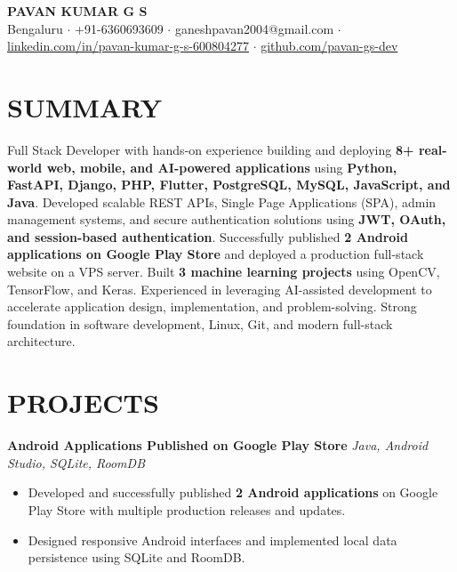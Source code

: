 \documentclass[10pt,a4paper]{article}
\begin{document}

\begin{center}
{\Huge \textbf{PAVAN KUMAR G S}}\\[2pt]

Bengaluru $\cdot$
+91-6360693609 $\cdot$
ganeshpavan2004@gmail.com $\cdot$
\href{https://linkedin.com/in/pavan-kumar-g-s-600804277}{linkedin.com/in/pavan-kumar-g-s-600804277}
$\cdot$
\href{https://github.com/pavan-gs-dev}{github.com/pavan-gs-dev}

\end{center}


\section*{SUMMARY}

Full Stack Developer with hands-on experience building and deploying \textbf{8+ real-world web, mobile, and AI-powered applications} using \textbf{Python, FastAPI, Django, PHP, Flutter, PostgreSQL, MySQL, JavaScript, and Java}. Developed scalable REST APIs, Single Page Applications (SPA), admin management systems, and secure authentication solutions using \textbf{JWT, OAuth, and session-based authentication}. Successfully published \textbf{2 Android applications on Google Play Store} and deployed a production full-stack website on a VPS server. Built \textbf{3 machine learning projects} using OpenCV, TensorFlow, and Keras. Experienced in leveraging AI-assisted development to accelerate application design, implementation, and problem-solving. Strong foundation in software development, Linux, Git, and modern full-stack architecture.


\section*{PROJECTS}

\textbf{Android Applications Published on Google Play Store}
\hfill \textit{Java, Android Studio, SQLite, RoomDB}

\begin{itemize}
\item Developed and successfully published \textbf{2 Android applications} on Google Play Store with multiple production releases and updates.
\item Designed responsive Android interfaces and implemented local data persistence using SQLite and RoomDB.
\end{itemize}
\end{document}
